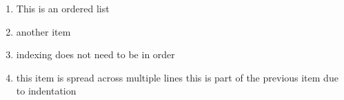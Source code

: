 \begin{enumerate}

    \item This is an ordered list

    \item another item

    \item indexing does not need to be in order

    \item this item is spread across multiple lines
    this is part of the previous item due to indentation

\end{enumerate}